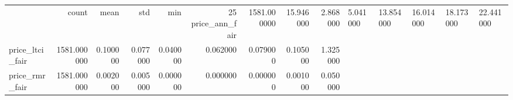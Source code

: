 \begin{tabular}{lrrrrrrrr}
\toprule
 & count & mean & std & min & 25%
\midrule
price_ann_fair & 1581.000000 & 15.946000 & 2.868000 & 5.041000 & 13.854000 & 16.014000 & 18.173000 & 22.441000 \\
price_ltci_fair & 1581.000000 & 0.100000 & 0.077000 & 0.040000 & 0.062000 & 0.079000 & 0.105000 & 1.325000 \\
price_rmr_fair & 1581.000000 & 0.002000 & 0.005000 & 0.000000 & 0.000000 & 0.000000 & 0.001000 & 0.050000 \\
\bottomrule
\end{tabular}
